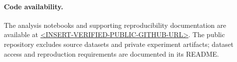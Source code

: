 \paragraph{Code availability.}
The analysis notebooks and supporting reproducibility documentation are available at
\url{<INSERT-VERIFIED-PUBLIC-GITHUB-URL>}.
The public repository excludes source datasets and private experiment artifacts; dataset
access and reproduction requirements are documented in its README.
